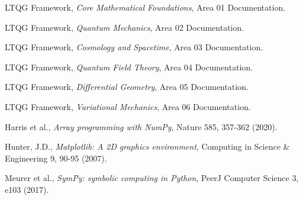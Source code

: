 \documentclass[11pt,a4paper]{article}
\theoremstyle{definition}
\theoremstyle{remark}
\begin{document}
\begin{thebibliography}{10}

 LTQG Framework, \textit{Core Mathematical Foundations}, Area 01 Documentation.

 LTQG Framework, \textit{Quantum Mechanics}, Area 02 Documentation.

 LTQG Framework, \textit{Cosmology and Spacetime}, Area 03 Documentation.

 LTQG Framework, \textit{Quantum Field Theory}, Area 04 Documentation.

 LTQG Framework, \textit{Differential Geometry}, Area 05 Documentation.

 LTQG Framework, \textit{Variational Mechanics}, Area 06 Documentation.

 Harris et al., \textit{Array programming with NumPy}, Nature 585, 357-362 (2020).

 Hunter, J.D., \textit{Matplotlib: A 2D graphics environment}, Computing in Science \& Engineering 9, 90-95 (2007).

 Meurer et al., \textit{SymPy: symbolic computing in Python}, PeerJ Computer Science 3, e103 (2017).

\end{thebibliography}
\end{document}
